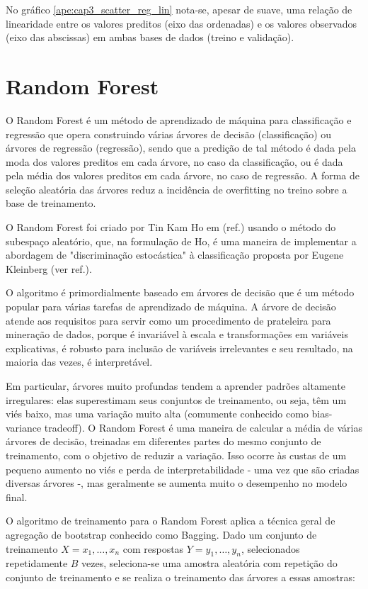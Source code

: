 No gráfico \ref{ape:cap3_scatter_reg_lin} nota-se, apesar de suave, uma relação de linearidade entre os valores preditos (eixo das ordenadas) e os valores observados (eixo das abscissas) em ambas bases de dados (treino e validação).

\section{Random Forest}
\label{sec:random_forest}

O Random Forest é um método de aprendizado de máquina para classificação e regressão que opera construindo várias árvores de decisão (classificação) ou árvores de regressão (regressão), sendo que a predição de tal método é dada pela moda dos valores preditos em cada árvore, no caso da classificação, ou é dada pela média dos valores preditos em cada árvore, no caso de regressão. A forma de seleção aleatória das árvores reduz a incidência de overfitting no treino sobre a base de treinamento.

O Random Forest foi criado por Tin Kam Ho em (ref.) usando o método do subespaço aleatório, que, na formulação de Ho, é uma maneira de implementar a abordagem de "discriminação estocástica" à classificação proposta por Eugene Kleinberg (ver ref.).

O algoritmo é primordialmente baseado em árvores de decisão que é um método popular para várias tarefas de aprendizado de máquina. A árvore de decisão atende aos requisitos para servir como um procedimento de prateleira para mineração de dados, porque é invariável à escala e transformações em variáveis explicativas, é robusto para inclusão de variáveis irrelevantes e seu resultado, na maioria das vezes, é interpretável.

Em particular, árvores muito profundas tendem a aprender padrões altamente irregulares: elas superestimam seus conjuntos de treinamento, ou seja, têm um viés baixo, mas uma variação muito alta (comumente conhecido como bias-variance tradeoff). O Random Forest é uma maneira de calcular a média de várias árvores de decisão, treinadas em diferentes partes do mesmo conjunto de treinamento, com o objetivo de reduzir a variação. Isso ocorre às custas de um pequeno aumento no viés e perda de interpretabilidade - uma vez que são criadas diversas árvores -, mas geralmente se aumenta muito o desempenho no modelo final.

O algoritmo de treinamento para o Random Forest aplica a técnica geral de agregação de bootstrap conhecido como Bagging. Dado um conjunto de treinamento $ {\displaystyle X = x_{1},\ldots ,x_{n}} $ com respostas $ {\displaystyle Y = y_{1},\ldots ,y_{n}} $, selecionados repetidamente $ B $ vezes, seleciona-se uma amostra aleatória com repetição do conjunto de treinamento e se realiza o treinamento das árvores a essas amostras:





